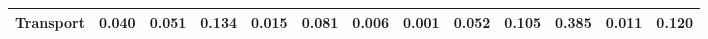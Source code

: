 \begin{table}[htbp]
\begin{tabular}{lcccccccccccc}
  Transport & \textcolor[RGB]{129,84,126}{0.040} & \textcolor[RGB]{119,77,136}{0.051} & \textcolor[RGB]{41,26,214}{0.134} & \textcolor[RGB]{184,119,71}{0.015} & \textcolor[RGB]{94,61,161}{0.081} & \textcolor[RGB]{216,140,39}{0.006} & \textcolor[RGB]{246,159,9}{0.001} & \textcolor[RGB]{117,76,138}{0.052} & \textcolor[RGB]{66,42,189}{0.105} & \textcolor[RGB]{7,5,248}{0.385} & \textcolor[RGB]{191,124,64}{0.011} & \textcolor[RGB]{55,36,200}{0.120} \\ 
   \hline
\end{tabular}
\end{table}
